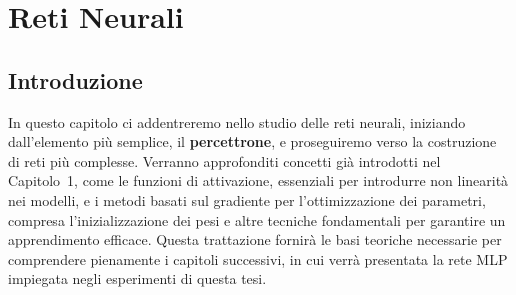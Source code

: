 \chapter{Reti Neurali}

\section{Introduzione}

In questo capitolo ci addentreremo nello studio delle reti neurali, iniziando dall'elemento più semplice, il \textbf{percettrone}, e proseguiremo verso la costruzione di reti più complesse.
Verranno approfonditi concetti già introdotti nel Capitolo~1, come le funzioni di attivazione, essenziali per introdurre non linearità nei modelli, e i metodi basati sul gradiente per l'ottimizzazione dei parametri, compresa l'inizializzazione dei pesi e altre tecniche fondamentali per garantire un apprendimento efficace. 
Questa trattazione fornirà le basi teoriche necessarie per comprendere pienamente i capitoli successivi, in cui verrà presentata la rete MLP impiegata negli esperimenti di questa tesi. 



